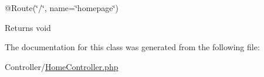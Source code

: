 @\+Route(\char`\"{}/\char`\"{}, name=\char`\"{}homepage\char`\"{})

\begin{DoxyReturn}{Returns}
void 
\end{DoxyReturn}


The documentation for this class was generated from the following file\+:\begin{DoxyCompactItemize}
\item 
Controller/\mbox{\hyperlink{_home_controller_8php}{Home\+Controller.\+php}}\end{DoxyCompactItemize}

